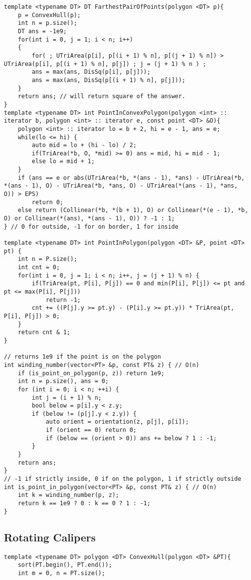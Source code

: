 \documentclass[10pt,a4paper,onesided]{article}
\begin{document}
\begin{multicols*}{3}
\begin{lstlisting}
template <typename DT> DT FarthestPairOfPoints(polygon <DT> p){
    p = ConvexHull(p);
    int n = p.size();
    DT ans = -1e9;
    for(int i = 0, j = 1; i < n; i++)
    {   
        for( ; UTriArea(p[i], p[(i + 1) % n], p[(j + 1) % n]) > UTriArea(p[i], p[(i + 1) % n], p[j]) ; j = (j + 1) % n ) ;
        ans = max(ans, DisSq(p[i], p[j]));
        ans = max(ans, DisSq(p[(i + 1) % n], p[j]));
    }
    return ans; // will return square of the answer.
}
template <typename DT> int PointInConvexPolygon(polygon <int> :: iterator b, polygon <int> :: iterator e, const point <DT> &O){
    polygon <int> :: iterator lo = b + 2, hi = e - 1, ans = e;
    while(lo <= hi) {
        auto mid = lo + (hi - lo) / 2;
        if(TriArea(*b, O, *mid) >= 0) ans = mid, hi = mid - 1;
        else lo = mid + 1;
    }
    if (ans == e or abs(UTriArea(*b, *(ans - 1), *ans) - UTriArea(*b, *(ans - 1), O) - UTriArea(*b, *ans, O) - UTriArea(*(ans - 1), *ans, O)) > EPS)
        return 0;
    else return (Collinear(*b, *(b + 1), O) or Collinear(*(e - 1), *b, O) or Collinear(*(ans), *(ans - 1), O)) ? -1 : 1;
} // 0 for outside, -1 for on border, 1 for inside

template <typename DT> int PointInPolygon(polygon <DT> &P, point <DT> pt) {
    int n = P.size();
    int cnt = 0;
    for(int i = 0, j = 1; i < n; i++, j = (j + 1) % n) {
        if(TriArea(pt, P[i], P[j]) == 0 and min(P[i], P[j]) <= pt and pt <= max(P[i], P[j]))
            return -1;
        cnt += ((P[j].y >= pt.y) - (P[i].y >= pt.y)) * TriArea(pt, P[i], P[j]) > 0; 
    }
    return cnt & 1;
}

// returns 1e9 if the point is on the polygon 
int winding_number(vector<PT> &p, const PT& z) { // O(n)
    if (is_point_on_polygon(p, z)) return 1e9;
    int n = p.size(), ans = 0;
    for (int i = 0; i < n; ++i) {
        int j = (i + 1) % n;
        bool below = p[i].y < z.y;
        if (below != (p[j].y < z.y)) {
            auto orient = orientation(z, p[j], p[i]);
            if (orient == 0) return 0;
            if (below == (orient > 0)) ans += below ? 1 : -1;
        }
    }
    return ans;
}
// -1 if strictly inside, 0 if on the polygon, 1 if strictly outside
int is_point_in_polygon(vector<PT> &p, const PT& z) { // O(n)
    int k = winding_number(p, z);
    return k == 1e9 ? 0 : k == 0 ? 1 : -1;
}\end{lstlisting}
\subsection{Rotating Calipers}
\begin{lstlisting}
template <typename DT> polygon <DT> ConvexHull(polygon <DT> &PT){
    sort(PT.begin(), PT.end());
    int m = 0, n = PT.size();
    

\end{lstlisting}
\end{multicols*}
\end{document}
